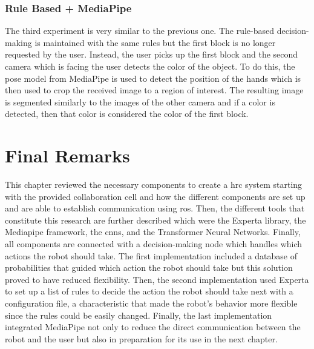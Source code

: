 \subsubsection{Rule Based + MediaPipe}

The third experiment is very similar to the previous one. The rule-based decision-making is maintained with the same rules but the first block is no longer requested by the user. Instead, the user picks up the first block and the second camera which is facing the user detects the color of the object. To do this, the pose model from MediaPipe is used to detect the position of the hands which is then used to crop the received image to a region of interest. The resulting image is segmented similarly to the images of the other camera and if a color is detected, then that color is considered the color of the first block.

\section{Final Remarks}
\label{section:materials_methods_final_remarks}

This chapter reviewed the necessary components to create a \acf{hrc} system starting with the provided collaboration cell and how the different components are set up and are able to establish communication using \acs{ros}. Then, the different tools that constitute this research are further described which were the Experta library, the Mediapipe framework, the \acfp{cnn}, and the Transformer Neural Networks. Finally, all components are connected with a decision-making node which handles which actions the robot should take. The first implementation included a database of probabilities that guided which action the robot should take but this solution proved to have reduced flexibility. Then, the second implementation used Experta to set up a list of rules to decide the action the robot should take next with a configuration file, a characteristic that made the robot's behavior more flexible since the rules could be easily changed. Finally, the last implementation integrated MediaPipe not only to reduce the direct communication between the robot and the user but also in preparation for its use in the next chapter.
